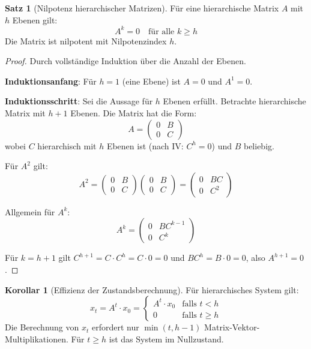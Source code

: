 \documentclass[a4paper,12pt]{report}
\theoremstyle{definition}
\newtheorem{satz}{Satz}
\newtheorem{korollar}{Korollar}
\begin{document}
	\begin{satz}[Nilpotenz hierarchischer Matrizen]
		Für eine hierarchische Matrix $A$ mit $h$ Ebenen gilt:
		\[
		A^k = 0 \quad \text{für alle } k \geq h
		\]
		Die Matrix ist nilpotent mit Nilpotenzindex $h$.
	\end{satz}
	
	\begin{proof}
		Durch vollständige Induktion über die Anzahl der Ebenen.
		
		\textbf{Induktionsanfang}: Für $h = 1$ (eine Ebene) ist $A = 0$ und $A^1 = 0$.
		
		\textbf{Induktionsschritt}: Sei die Aussage für $h$ Ebenen erfüllt. Betrachte hierarchische Matrix mit $h+1$ Ebenen. Die Matrix hat die Form:
		\[
		A = \begin{pmatrix}
			0 & B \\
			0 & C
		\end{pmatrix}
		\]
		wobei $C$ hierarchisch mit $h$ Ebenen ist (nach IV: $C^h = 0$) und $B$ beliebig.
		
		Für $A^2$ gilt:
		\[
		A^2 = \begin{pmatrix}
			0 & B \\
			0 & C
		\end{pmatrix} \begin{pmatrix}
			0 & B \\
			0 & C
		\end{pmatrix} = \begin{pmatrix}
			0 & BC \\
			0 & C^2
		\end{pmatrix}
		\]
		
		Allgemein für $A^k$:
		\[
		A^k = \begin{pmatrix}
			0 & BC^{k-1} \\
			0 & C^k
		\end{pmatrix}
		\]
		
		Für $k = h+1$ gilt $C^{h+1} = C \cdot C^h = C \cdot 0 = 0$ und $BC^h = B \cdot 0 = 0$, also $A^{h+1} = 0$.
	\end{proof}
	
	\begin{korollar}[Effizienz der Zustandsberechnung]
		Für hierarchisches System gilt:
		\[
		x_t = A^t \cdot x_0 = \begin{cases}
			A^t \cdot x_0 & \text{falls } t < h \\
			0 & \text{falls } t \geq h
		\end{cases}
		\]
		Die Berechnung von $x_t$ erfordert nur $\min(t, h-1)$ Matrix-Vektor-Multiplikationen. Für $t \geq h$ ist das System im Nullzustand.
	\end{korollar}
	
\end{document}
